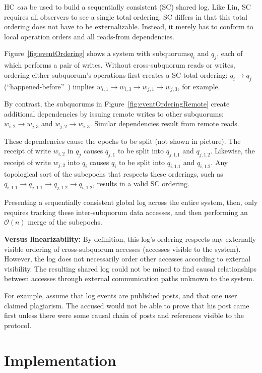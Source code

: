 \documentclass[letterpaper,10pt,twocolumn]{article}
\newcommand{\sub}{subquorum\xspace}
\newcommand{\subs}{subquorums\xspace}
\newcommand{\para}[1]{\vspace{.04in}\noindent\textbf{#1}}
\begin{document}
HC \emph{can} be used to build a sequentially consistent (SC) shared log.
Like Lin, SC requires all observers to see a single total ordering.
SC differs in that this total ordering does not have to be externalizable.
Instead, it merely has to conform to local operation orders and all reads-from
dependencies.

Figure~\ref{fig:eventOrdering} shows a system with \subs $q_i$ and $q_j$, each of which
performs a pair of writes.
Without cross-\sub reads or writes, ordering either
\sub's operations first creates a SC total ordering: $q_i \rightarrow q_j$ (``happened-before''~\cite{lamport_time_1978})
implies $w_{i,1} \rightarrow w_{i,3} \rightarrow w_{j,1} \rightarrow w_{j,3}$,
for example.

By contrast, the \subs in Figure~\ref{fig:eventOrderingRemote} create
additional dependencies by issuing remote writes to other \subs: $w_{i,2}
\rightarrow w_{j,3}$ and $w_{j,2} \rightarrow w_{i,3}$.
Similar dependencies result from remote reads.

These dependencies cause the epochs to be split (not shown in picture).
The receipt of write $w_{i,2}$ in $q_j$ causes $q_{j,1}$ to be split into
$q_{j,1.1}$ and $q_{j,1.2}$.
Likewise, the receipt of write $w_{j,2}$ into $q_i$ causes $q_i$ to be split
into $q_{i,1.1}$ and $q_{i,1.2}$.
Any topological sort of the subepochs that respects these orderings, such as
$q_{i,1.1} \rightarrow q_{j,1.1} \rightarrow q_{j,1.2} \rightarrow q_{i,1.2}$,
results in a valid SC ordering.

Presenting a sequentially consistent global log across the entire system,
then, only requires tracking these inter-\sub data accesses, and then
performing an $\mathcal{O}(n)$ merge of the subepochs.

\para{Versus linearizability:} By definition, this log's ordering respects any
externally visible ordering of cross-\sub accesses (accesses visible to the
system).
However, the log does not necessarily order other accesses according to
external visibility.
The resulting shared log could not be mined to find causal relationships
between accesses through external communication paths unknown to the system.

For example, assume that log events are published posts, and that one user claimed
plagiarism.
The accused would not be able to prove that his post came first unless there
were some causal chain of posts and references visible to the protocol.

\section{Implementation}
\label{sec:implementation}
\end{document}
